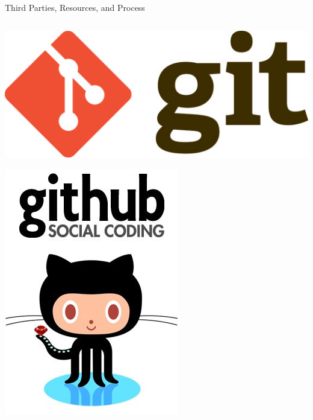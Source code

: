 \begin{frame}{Third Parties, Resources, and Process}

	\begin{columns}

		\begin{column}{0.12\textwidth}

			\includegraphics[width=\textwidth]{intro/git}
			\medskip

			\includegraphics[width=\textwidth]{intro/github}
			\smallskip
			

\end{column}
\end{columns}
\end{frame}
